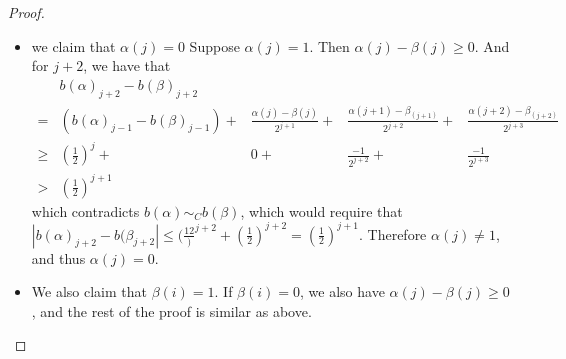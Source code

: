 \begin{proof}
  \begin{itemize}
    \item 
      we claim that $\alpha(j) = 0$ 
      Suppose $\alpha(j) = 1$. 
      Then $\alpha(j) -\beta(j) \geq 0$. 
      And for $j + 2$, we have that 
  \begin{align}
    &b(\alpha)_{j+2} - b(\beta)_{j+2}
    \\
    =  
    &(b(\alpha)_{j-1} - b(\beta)_{j-1}) + 
    &\frac{\alpha(j)-\beta(j)}{2^{j+1}} +  
    &\frac{\alpha(j+1) - \beta_(j+1)}{2^{j+2}}
    +
    &\frac{\alpha(j+2) - \beta_(j+2)}{2^{j+3}}
    \\
    \geq  
      & (\frac12)^j + &0 
    + &\frac{-1}{2^{j+2}} 
    + &\frac{-1}{2^{j+3}} 
    \\
      > &(\frac12)^{j+1}
  \end{align}
  which contradicts $b(\alpha) \sim_Cb(\beta)$, 
  which would require that $|b(\alpha)_{j+2} - b(\beta_{j+2} | \leq (\frac{12})^{j+2}+ (\frac12)^{j+2} = (\frac12)^{j+1}$. 
  Therefore $\alpha(j) \neq 1$, and thus $\alpha(j) = 0$. 
    \item 
      We also claim that $\beta(i) = 1$. 
      If $\beta(i) = 0$, we also have 
      $\alpha(j) -\beta(j) \geq 0$, and the rest of the proof is similar as above. 
  \end{itemize}
\end{proof}

